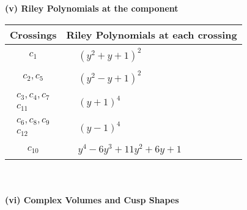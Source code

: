 \documentclass[1p]{elsarticle_modified}
\theoremstyle{definition}
\begin{document}
\newpage\renewcommand{\arraystretch}{1}
\flushleft \textbf{(v) Riley Polynomials at the component}\newline \\
\begin{tabular}{m{50pt}|m{274pt}}
Crossings & \hspace{64pt}Riley Polynomials at each crossing \\
\hline $$\begin{aligned}c_{1}\end{aligned}$$&$\begin{aligned}
&(y^2+y+1)^2
\end{aligned}$\\
\hline $$\begin{aligned}c_{2},c_{5}\end{aligned}$$&$\begin{aligned}
&(y^2- y+1)^2
\end{aligned}$\\
\hline $$\begin{aligned}c_{3},c_{4},c_{7}\\c_{11}\end{aligned}$$&$\begin{aligned}
&(y+1)^4
\end{aligned}$\\
\hline $$\begin{aligned}c_{6},c_{8},c_{9}\\c_{12}\end{aligned}$$&$\begin{aligned}
&(y-1)^4
\end{aligned}$\\
\hline $$\begin{aligned}c_{10}\end{aligned}$$&$\begin{aligned}
&y^4-6 y^3+11 y^2+6 y+1
\end{aligned}$\\
\hline
\end{tabular}\\~\\
\newpage\flushleft \textbf{(vi) Complex Volumes and Cusp Shapes}
\end{document}
